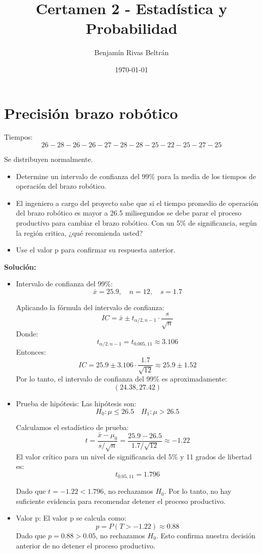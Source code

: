 \documentclass{article}
\title{Certamen 2 - Estadística y Probabilidad}
\author{Benjamín Rivas Beltrán}
\date{\today}
\begin{document}
\maketitle

\section{Precisión brazo robótico}
Tiempos:
\[
26 - 28 - 26 - 26 - 27 - 28 - 28 - 25 - 22 - 25 - 27 - 25
\]

Se distribuyen normalmente.

\begin{itemize}
  \item Determine un intervalo de confianza del 99\% para la media de los tiempos de operación del brazo robótico.
  \item El ingeniero a cargo del proyecto sabe que si el tiempo promedio de operación del brazo robótico es mayor a 26.5 milisegundos se debe parar el proceso productivo para cambiar el brazo robótico. Con un 5\% de significancia, según la región critica, ¿qué recomienda usted?
  \item Use el valor p para confirmar su respuesta anterior.
\end{itemize}

\textbf{Solución:}
\begin{itemize}
  \item Intervalo de confianza del 99\%:
  \[
  \bar{x} = 25.9, \quad n = 12, \quad s = 1.7
  \]

  Aplicando la fórmula del intervalo de confianza:
  \[
  IC = \bar{x} \pm t_{\alpha/2, n-1} \cdot \frac{s}{\sqrt{n}}
  \]
  Donde:
  \[
  t_{\alpha/2, n-1} = t_{0.005, 11} \approx 3.106
  \]
  Entonces:
  \[
  IC = 25.9 \pm 3.106 \cdot \frac{1.7}{\sqrt{12}} \approx 25.9 \pm 1.52
  \]
  Por lo tanto, el intervalo de confianza del 99\% es aproximadamente:
  \[
  (24.38, 27.42)
  \]

  \item Prueba de hipótesis:
  Las hipótesis son:
  \[
  H_0: \mu \leq 26.5 \quad \text{} H_1: \mu > 26.5
  \]

  Calculamos el estadístico de prueba:
  \[
  t = \frac{\bar{x} - \mu_0}{s/\sqrt{n}} = \frac{25.9 - 26.5}{1.7/\sqrt{12}} \approx -1.22
  \]
  El valor crítico para un nivel de significancia del 5\% y 11 grados de libertad es:
  \[
  t_{0.05, 11} = 1.796
  \]

  Dado que \( t = -1.22 < 1.796 \), no rechazamos \( H_0 \). Por lo tanto, no hay suficiente evidencia para recomendar detener el proceso productivo.

  \item Valor p:
  El valor p se calcula como:
  \[
  p = P(T > -1.22) \approx 0.88
  \]
  Dado que \( p = 0.88 > 0.05 \), no rechazamos \( H_0 \). Esto confirma nuestra decisión anterior de no detener el proceso productivo. 
\end{itemize}
\end{document}
